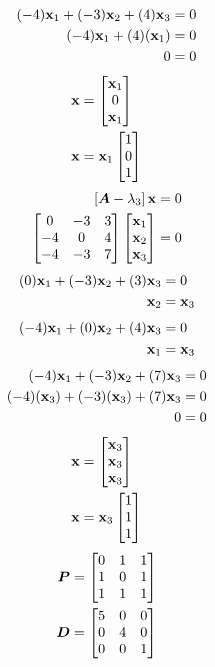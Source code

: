 \documentclass{article}
\begin{document}
\begin{align*}
	(-4)\vect{x}_1 + (-3)\vect{x}_2 + (4)\vect{x}_3 & = 0 \\
	(-4)\vect{x}_1 + (4)(\vect{x}_1) & = 0 \\
	0 & = 0
\end{align*}
\begin{align*}
	\vect{x} & = \begin{bmatrix} \vect{x}_1 \\ 0 \\ \vect{x}_1 \end{bmatrix} \\
	\vect{x} & = \vect{x}_1 \begin{bmatrix} 1 \\ 0 \\ 1 \end{bmatrix}
\end{align*}
\begin{align*}
	\left[ \matr{A} - \lambda_3 \right] \vect{x} & = 0 \\
	\begin{bmatrix}
		0 & -3 & 3 \\
		-4 & 0 & 4 \\
		-4 & -3 & 7
	\end{bmatrix}
	\begin{bmatrix} \vect{x}_1 \\ \vect{x}_2 \\ \vect{x}_3 \end{bmatrix} & = 0
\end{align*}
\begin{align*}
	(0)\vect{x}_1 + (-3)\vect{x}_2 + (3)\vect{x}_3 & = 0 \\
	\vect{x}_2 & = \vect{x}_3
\end{align*}
\begin{align*}
	(-4)\vect{x}_1 + (0)\vect{x}_2 + (4)\vect{x}_3 & = 0 \\
	\vect{x}_1 & = \vect{x}_3
\end{align*}
\begin{align*}
	(-4)\vect{x}_1 + (-3)\vect{x}_2 + (7)\vect{x}_3 & = 0 \\
	(-4)(\vect{x}_3) + (-3)(\vect{x}_3) + (7)\vect{x}_3 & = 0 \\
	0 & = 0
\end{align*}
\begin{align*}
	\vect{x} & = \begin{bmatrix} \vect{x}_3 \\ \vect{x}_3 \\ \vect{x}_3 \end{bmatrix} \\
	\vect{x} & =\vect{x}_3 \begin{bmatrix} 1 \\ 1 \\ 1 \end{bmatrix}
\end{align*}
\begin{align*}
	\bm{P} & =
		\begin{bmatrix}
			0 & 1 & 1 \\
			1 & 0 & 1 \\
			1 & 1 & 1
		\end{bmatrix} \\
	\bm{D} & =
		\begin{bmatrix}
			5 & 0 & 0 \\
			0 & 4 & 0 \\
			0 & 0 & 1
		\end{bmatrix}
\end{align*}
\end{document}
